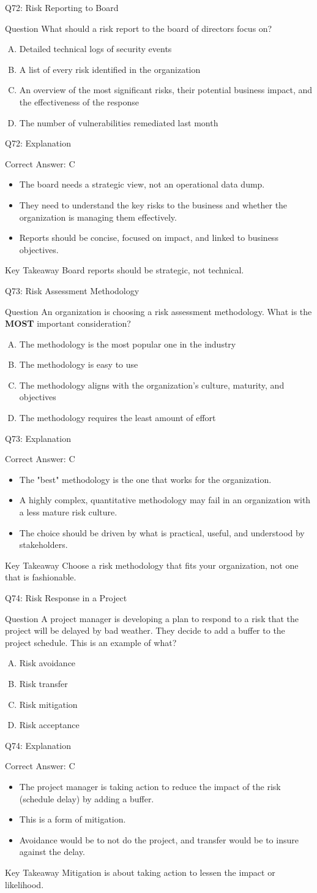 \documentclass[aspectratio=169]{beamer}
\newcommand{\hq}[7]{%
	\begin{frame}{Q#1: #2}
		\begin{block}{Question}
			#3
		\end{block}
		\begin{enumerate}[(A)]
			#4
		\end{enumerate}
	\end{frame}
	\begin{frame}{Q#1: Explanation}
		\begin{block}{Correct Answer: #5}
			\begin{itemize}
				#6
			\end{itemize}
		\end{block}
		\begin{alertblock}{Key Takeaway}
			#7
		\end{alertblock}
	\end{frame}
}
\begin{document}
	\hq{72}{Risk Reporting to Board}
	{What should a risk report to the board of directors focus on?}
	{\item Detailed technical logs of security events
		\item A list of every risk identified in the organization
		\item An overview of the most significant risks, their potential business impact, and the effectiveness of the response
		\item The number of vulnerabilities remediated last month}
	{C}
	{\item The board needs a strategic view, not an operational data dump.
		\item They need to understand the key risks to the business and whether the organization is managing them effectively.
		\item Reports should be concise, focused on impact, and linked to business objectives.}
	{Board reports should be strategic, not technical.}
	
	\hq{73}{Risk Assessment Methodology}
	{An organization is choosing a risk assessment methodology. What is the \textbf{MOST} important consideration?}
	{\item The methodology is the most popular one in the industry
		\item The methodology is easy to use
		\item The methodology aligns with the organization's culture, maturity, and objectives
		\item The methodology requires the least amount of effort}
	{C}
	{\item The "best" methodology is the one that works for the organization.
		\item A highly complex, quantitative methodology may fail in an organization with a less mature risk culture.
		\item The choice should be driven by what is practical, useful, and understood by stakeholders.}
	{Choose a risk methodology that fits your organization, not one that is fashionable.}
	
	\hq{74}{Risk Response in a Project}
	{A project manager is developing a plan to respond to a risk that the project will be delayed by bad weather. They decide to add a buffer to the project schedule. This is an example of what?}
	{\item Risk avoidance
		\item Risk transfer
		\item Risk mitigation
		\item Risk acceptance}
	{C}
	{\item The project manager is taking action to reduce the impact of the risk (schedule delay) by adding a buffer.
		\item This is a form of mitigation.
		\item Avoidance would be to not do the project, and transfer would be to insure against the delay.}
	{Mitigation is about taking action to lessen the impact or likelihood.}
	
\end{document}
